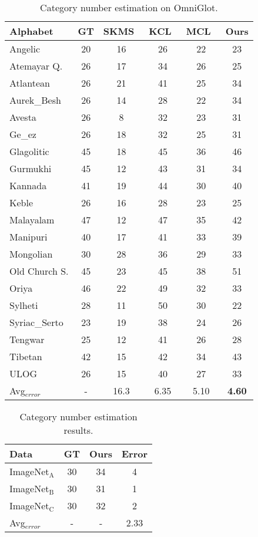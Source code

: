\begin{table}[ht]
\footnotesize
\centering
\caption{Category number estimation on OmniGlot.}\label{tab:omniglot_k_est}
\setlength\tabcolsep{1pt}
\begin{tabular}{lccccc}
\toprule
Alphabet      & GT & SKMS~\cite{Anand14_SKMS} & KCL~\cite{Hsu18_L2C} & MCL~\cite{Hsu19_MCL}  & Ours \\
\midrule
Angelic & 20 & 16 & 26 & 22 & 23\\
Atemayar Q. & 26 & 17 & 34 & 26 & 25\\
Atlantean & 26 & 21 & 41 & 25 & 34\\
Aurek\_Besh & 26 & 14 & 28 & 22 & 34\\
Avesta & 26 & 8 & 32 & 23 & 31\\
Ge\_ez & 26 & 18 & 32 & 25 & 31\\
Glagolitic & 45 & 18 & 45 & 36 & 46\\
Gurmukhi & 45 & 12 & 43 & 31 & 34\\
Kannada & 41 & 19 & 44 & 30 & 40\\
Keble & 26 & 16 & 28 & 23 & 25\\
Malayalam & 47 & 12 & 47 & 35 & 42\\
Manipuri & 40 & 17 & 41 & 33 & 39\\
Mongolian & 30 & 28 & 36 & 29 & 33\\
Old Church S. & 45 & 23 & 45 & 38 & 51\\
Oriya & 46 & 22 & 49 & 32 & 33\\
Sylheti & 28 & 11 & 50 & 30 & 22\\
Syriac\_Serto & 23 & 19 & 38 & 24 & 26\\
Tengwar & 25 & 12 & 41 & 26 & 28\\
Tibetan & 42 & 15 & 42 & 34 & 43\\
ULOG & 26 & 15 & 40 & 27 & 33\\
\midrule
Avg$_{error}$ & - & 16.3 & 6.35 & 5.10 & \textbf{4.60} \\
\bottomrule
\end{tabular}
\end{table}

\begin{table}[ht]
\centering
\footnotesize
\caption{Category number estimation results.}\label{tab:imagenet_k_est}
\begin{tabular}{lccc}
\toprule
Data & GT  & Ours & Error \\
\midrule
ImageNet$_\text{A}$ & 30 & 34 & 4\\
ImageNet$_\text{B}$ & 30 & 31 & 1\\
ImageNet$_\text{C}$ & 30 & 32 & 2\\
\midrule
Avg$_{error}$ & - & - & 2.33\\
\bottomrule
\end{tabular}
\end{table}

